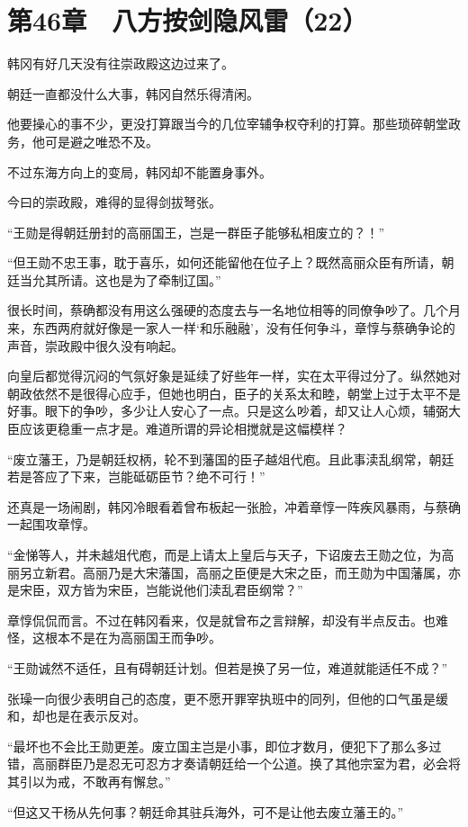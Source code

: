 \section{第46章　八方按剑隐风雷（22）}

韩冈有好几天没有往崇政殿这边过来了。

朝廷一直都没什么大事，韩冈自然乐得清闲。

他要操心的事不少，更没打算跟当今的几位宰辅争权夺利的打算。那些琐碎朝堂政务，他可是避之唯恐不及。

不过东海方向上的变局，韩冈却不能置身事外。

今曰的崇政殿，难得的显得剑拔弩张。

“王勋是得朝廷册封的高丽国王，岂是一群臣子能够私相废立的？！”

“但王勋不忠王事，耽于喜乐，如何还能留他在位子上？既然高丽众臣有所请，朝廷当允其所请。这也是为了牵制辽国。”

很长时间，蔡确都没有用这么强硬的态度去与一名地位相等的同僚争吵了。几个月来，东西两府就好像是一家人一样‘和乐融融’，没有任何争斗，章惇与蔡确争论的声音，崇政殿中很久没有响起。

向皇后都觉得沉闷的气氛好象是延续了好些年一样，实在太平得过分了。纵然她对朝政依然不是很得心应手，但她也明白，臣子的关系太和睦，朝堂上过于太平不是好事。眼下的争吵，多少让人安心了一点。只是这么吵着，却又让人心烦，辅弼大臣应该更稳重一点才是。难道所谓的异论相搅就是这幅模样？

“废立藩王，乃是朝廷权柄，轮不到藩国的臣子越俎代庖。且此事渎乱纲常，朝廷若是答应了下来，岂能砥砺臣节？绝不可行！”

还真是一场闹剧，韩冈冷眼看着曾布板起一张脸，冲着章惇一阵疾风暴雨，与蔡确一起围攻章惇。

“金悌等人，并未越俎代庖，而是上请太上皇后与天子，下诏废去王勋之位，为高丽另立新君。高丽乃是大宋藩国，高丽之臣便是大宋之臣，而王勋为中国藩属，亦是宋臣，双方皆为宋臣，岂能说他们渎乱君臣纲常？”

章惇侃侃而言。不过在韩冈看来，仅是就曾布之言辩解，却没有半点反击。也难怪，这根本不是在为高丽国王而争吵。

“王勋诚然不适任，且有碍朝廷计划。但若是换了另一位，难道就能适任不成？”

张璪一向很少表明自己的态度，更不愿开罪宰执班中的同列，但他的口气虽是缓和，却也是在表示反对。

“最坏也不会比王勋更差。废立国主岂是小事，即位才数月，便犯下了那么多过错，高丽群臣乃是忍无可忍方才奏请朝廷给一个公道。换了其他宗室为君，必会将其引以为戒，不敢再有懈怠。”

“但这又干杨从先何事？朝廷命其驻兵海外，可不是让他去废立藩王的。”

